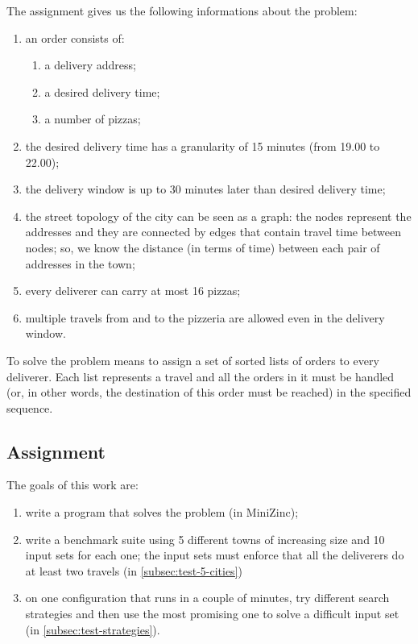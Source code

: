 \documentclass[10pt]{article}
\begin{document}
	The assignment gives us the following informations about the problem:
	\begin{enumerate}
		\item an order consists of:
		\begin{enumerate}
			\item a delivery address;
			\item a desired delivery time;
			\item a number of pizzas;
		\end{enumerate}
		\item the desired delivery time has a granularity of 15 minutes (from 
			19.00 to 22.00);
		\item the delivery window is up to 30 minutes later than desired delivery 
			time;
		\item the street topology of the city can be seen as a graph: the nodes represent
			the addresses and they are connected by edges that contain travel time 
			between nodes; so, we know the distance (in terms of time) between each pair of addresses
			in the town;
		\item every deliverer can carry at most 16 pizzas;
		\item multiple travels from and to the pizzeria are allowed even in the 
			delivery window.
	\end{enumerate}

	To solve the problem means to assign a set of sorted lists of orders 
 	to every deliverer. Each list represents a travel and all the orders in it 
	must be handled (or, in other words, the destination of this order must be reached) 
	in the specified sequence.

	\subsection{Assignment}

	The goals of this work are:
	\begin{enumerate}
		\item write a program that solves the problem (in MiniZinc);
		\item write a benchmark suite using 5 different towns of increasing size
			and 10 input sets for each one; the input sets must enforce that all
			the deliverers do at least two travels (in \cref{subsec:test-5-cities})
		\item on one configuration that runs in a couple of minutes, try
			different search strategies and then use the most promising one to solve a
			difficult input set (in \cref{subsec:test-strategies}).
	\end{enumerate}
\end{document}
